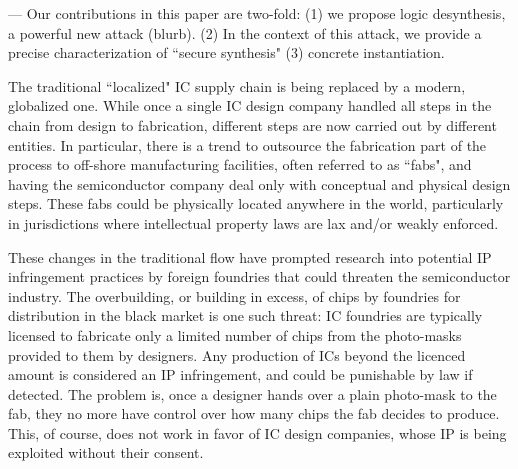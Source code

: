 --- Our contributions in this paper are two-fold: 
(1) we propose logic desynthesis, a 
powerful new attack (blurb). 
(2) In the context of this attack, we provide a 
precise 
characterization of ``secure synthesis" 
(3) concrete instantiation.







 
 
 
 
 
 
The traditional ``localized" IC supply chain is being replaced by a modern, globalized one. While once a single IC design company handled all steps in the chain from design to fabrication, different steps are now carried out by different entities. In particular, there is a trend to outsource the fabrication part of the process to off-shore manufacturing facilities, often referred to as ``fabs", and having the semiconductor company deal only with conceptual and physical design steps. These fabs could be physically located anywhere in the world, particularly in jurisdictions where intellectual property laws are lax  and/or weakly enforced.

These changes in the traditional flow have prompted research into potential IP infringement practices by foreign foundries that could threaten the semiconductor industry. The overbuilding, or building in excess, of chips by foundries for distribution in the black market is one such threat: IC foundries are typically licensed to fabricate only a limited number of chips from the photo-masks provided to them by designers. Any production of ICs beyond the licenced amount is considered an IP infringement, and could be punishable by law if detected. The problem is, once a designer hands over a plain photo-mask to the fab, they no more have control over how many chips the fab decides to produce. This, of course, does not work in favor of IC design companies, whose IP is being exploited without their consent. 

